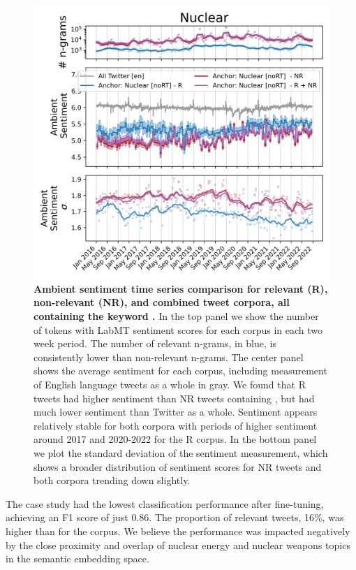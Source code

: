 \begin{figure}[tp!]
  \centering	
    \includegraphics[width=0.98\columnwidth]{figures/Nuclear_sentiment_2016-01-01_2022-08-31.png}  
  \caption{
    \textbf{Ambient sentiment time series comparison for relevant (R), non-relevant (NR), and combined tweet corpora,
    all containing the keyword .}
    In the top panel
    we show the number of tokens with LabMT \cite{dodds2015human}
    sentiment scores for each corpus in each two week period.
    The number of relevant n-grams,
    in blue,
    is consistently lower than non-relevant n-grams. 
    The center panel shows the average sentiment for each corpus,
    including measurement of English language tweets as a whole in gray. 
    We found that
    R tweets had higher sentiment than NR tweets
    containing ,
    but had much lower sentiment than Twitter as a whole.
    Sentiment appears relatively stable for both corpora
    with periods of higher sentiment around 2017 and 2020-2022 for the R corpus.
    In the bottom panel we plot the standard deviation of the sentiment measurement, which shows a broader distribution of sentiment scores for NR tweets and both corpora trending down slightly. 
  }
  \label{fig:nuclear_sentiment}
\end{figure}

The  case study had the lowest classification performance after fine-tuning, 
achieving an F1 score of just 0.86. 
The proportion of relevant tweets, 16\%, was higher than for the  corpus. 
We believe the performance was impacted negatively by the close proximity and overlap
of nuclear energy and nuclear weapons topics in the semantic embedding space. 


